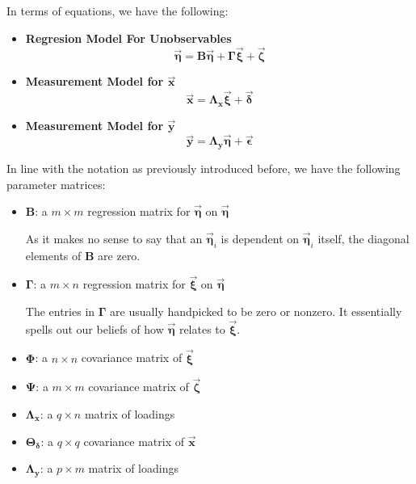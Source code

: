 \documentclass{article}
\begin{document}
\begin{multicols*}{2}
In terms of equations, we have the following:

\begin{itemize}
    \item \textbf{Regresion Model For Unobservables}
    \[\mathbf{\vec{\eta}} = \mathbf{B}\mathbf{\vec{\eta}} + \mathbf{\Gamma}\mathbf{\vec{\xi}} + \mathbf{\vec{\zeta}}\]
    \item \textbf{Measurement Model for $\mathbf{\vec{x}}$}
    \[\mathbf{\vec{x}} = \mathbf{\Lambda_x}\mathbf{\vec{\xi}} + \mathbf{\vec{\delta}}\]
    \item \textbf{Measurement Model for $\mathbf{\vec{y}}$}
    \[\mathbf{\vec{y}} = \mathbf{\Lambda_y}\mathbf{\vec{\eta}} + \mathbf{\vec{\epsilon}}\]
\end{itemize}

In line with the notation as previously introduced before, we have the following parameter matrices:

\begin{itemize}
    \item $\mathbf{B}$: a $m \times m$ regression matrix for $\mathbf{\vec{\eta}}$ on $\mathbf{\vec{\eta}}$
    
    As it makes no sense to say that an $\mathbf{\vec{\eta}}_i$ is dependent on $\mathbf{\vec{\eta}}_i$ itself, the diagonal elements of $\mathbf{B}$ are zero.

    \item $\mathbf{\Gamma}$: a $m \times n$ regression matrix for $\mathbf{\vec{\xi}}$ on $\mathbf{\vec{\eta}}$
    
    The entries in $\mathbf{\Gamma}$ are usually handpicked to be zero or nonzero. It essentially spells out our beliefs of how $\mathbf{\vec{\eta}}$ relates to $\mathbf{\vec{\xi}}$.

    \item $\mathbf{\Phi}$: a $n \times n$ covariance matrix of $\mathbf{\vec{\xi}}$
    \item $\mathbf{\Psi}$: a $m \times m$ covariance matrix of $\mathbf{\vec{\zeta}}$

    \item $\mathbf{\Lambda_x}$: a $ q \times n$ matrix of loadings

    \item $\mathbf{\Theta_\delta}$: a $q \times q$ covariance matrix of $\mathbf{\vec{x}}$

    \item $\mathbf{\Lambda_y}$: a $p \times m$ matrix of loadings


\end{itemize}
\end{multicols*}
\end{document}
